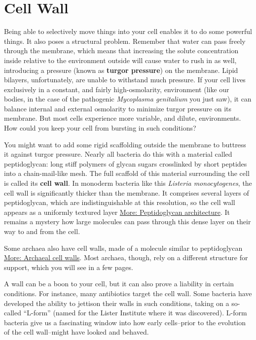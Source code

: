 \documentclass[]{tufte-book}
\begin{document}
\hypertarget{cell-wall}{%
\section{Cell Wall}\label{cell-wall}}

Being able to selectively move things into your cell enables it to do some powerful things. It also poses a structural problem. Remember that water can pass freely through the membrane, which means that increasing the solute concentration inside relative to the environment outside will cause water to rush in as well, introducing a pressure (known as \textbf{turgor pressure}) on the membrane. Lipid bilayers, unfortunately, are unable to withstand much pressure. If your cell lives exclusively in a constant, and fairly high-osmolarity, environment (like our bodies, in the case of the pathogenic \emph{Mycoplasma genitalium} you just saw), it can balance internal and external osmolarity to minimize turgor pressure on its membrane. But most cells experience more variable, and dilute, environments. How could you keep your cell from bursting in such conditions?

You might want to add some rigid scaffolding outside the membrane to buttress it against turgor pressure. Nearly all bacteria do this with a material called peptidoglycan: long stiff polymers of glycan sugars crosslinked by short peptides into a chain-mail-like mesh. The full scaffold of this material surrounding the cell is called its \textbf{cell wall}. In monoderm bacteria like this \emph{Listeria monocytogenes}, the cell wall is significantly thicker than the membrane. It comprises several layers of peptidoglycan, which are indistinguishable at this resolution, so the cell wall appears as a uniformly textured layer \protect\hyperlink{Peptidoglycan_architecture}{More: Peptidoglycan architecture}. It remains a mystery how large molecules can pass through this dense layer on their way to and from the cell.

Some archaea also have cell walls, made of a molecule similar to peptidoglycan \protect\hyperlink{Archaeal_cell_walls}{More: Archaeal cell walls}. Most archaea, though, rely on a different structure for support, which you will see in a few pages.

A wall can be a boon to your cell, but it can also prove a liability in certain conditions. For instance, many antibiotics target the cell wall. Some bacteria have developed the ability to jettison their walls in such conditions, taking on a so-called ``L-form'' (named for the Lister Institute where it was discovered). L-form bacteria give us a fascinating window into how early cells--prior to the evolution of the cell wall--might have looked and behaved.
\end{document}
